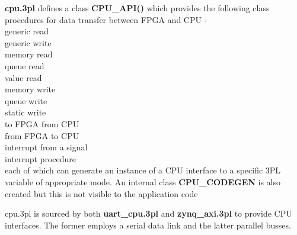     {\bf cpu.3pl} defines a class {\bf CPU\_API()} which provides the following
    class procedures for data transfer between FPGA and CPU - \\
        \hspace*{1cm}{\bf read()} generic read  \\
        \hspace*{1cm}{\bf write()} generic write  \\
        \hspace*{1cm}{\bf read\_memory()} memory read  \\
        \hspace*{1cm}{\bf read\_queue()} queue read  \\
        \hspace*{1cm}{\bf read\_value()} value read  \\
        \hspace*{1cm}{\bf write\_memory()} memory write  \\
        \hspace*{1cm}{\bf write\_queue()} queue write  \\
        \hspace*{1cm}{\bf write\_static()} static write  \\
        \hspace*{1cm}{\bf dma\_read()} to FPGA from CPU  \\
        \hspace*{1cm}{\bf dma\_write()} from FPGA to CPU  \\
        \hspace*{1cm}{\bf signal\_interrupt()} interrupt from a signal  \\
        \hspace*{1cm}{\bf interrupt()} interrupt procedure  \\

    each of which can generate an instance of a CPU interface to a specific 3PL
    variable of appropriate mode. An internal class {\bf CPU\_CODEGEN} is also
    created but this is not visible to the application code 
    
    cpu.3pl is sourced by both {\bf uart\_cpu.3pl} and {\bf zynq\_axi.3pl} to
    provide CPU interfaces. The former employs a serial data link and the
    latter parallel busses.
    
